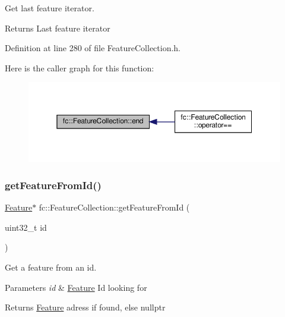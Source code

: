 Get last feature iterator. 

\begin{DoxyReturn}{Returns}
Last feature iterator 
\end{DoxyReturn}


Definition at line 280 of file Feature\+Collection.\+h.

Here is the caller graph for this function\+:
\nopagebreak
\begin{figure}[H]
\begin{center}
\leavevmode
\includegraphics[width=350pt]{d9/d78/classfc_1_1FeatureCollection_ac531c63b2dae4e4541b26a3926594dd0_icgraph}
\end{center}
\end{figure}
\mbox{\label{classfc_1_1FeatureCollection_ae805790886eadef004168a2d7bd5dd07}} 
\subsubsection{\texorpdfstring{get\+Feature\+From\+Id()}{getFeatureFromId()}}
{\footnotesize\ttfamily \hyperlink{classfc_1_1Feature}{Feature}$\ast$ fc\+::\+Feature\+Collection\+::get\+Feature\+From\+Id (\begin{DoxyParamCaption}\item[{uint32\+\_\+t}]{id }\end{DoxyParamCaption})\hspace{0.3cm}{\ttfamily [inline]}}



Get a feature from an id. 


\begin{DoxyParams}{Parameters}
{\em id} & \hyperlink{classfc_1_1Feature}{Feature} Id looking for \\
\hline
\end{DoxyParams}
\begin{DoxyReturn}{Returns}
\hyperlink{classfc_1_1Feature}{Feature} adress if found, else nullptr 
\end{DoxyReturn}


